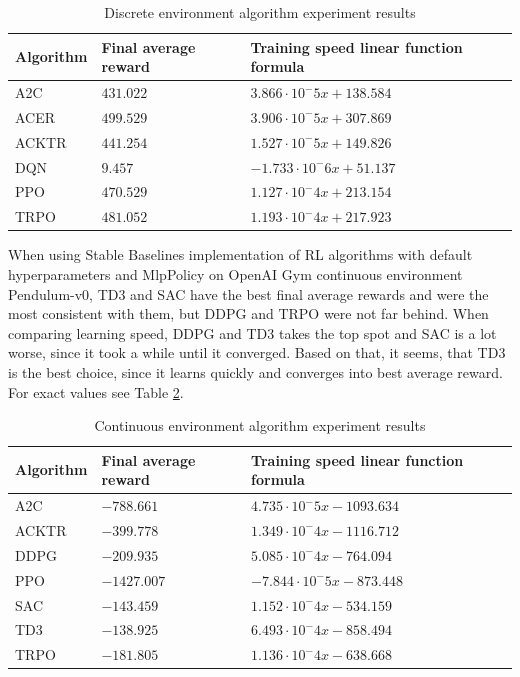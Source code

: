 \documentclass[12pt, a4paper]{article}
\begin{document}
\begin{table}[H]
\centering
\begin{tabular}{|l|l|l|} 
\hline
Algorithm & Final average reward & Training speed linear function formula  \\ 
\hline
A2C       & $431.022$              & $3.866\cdot10^-5x + 138.584$                     \\
ACER      & $499.529$              & $3.906\cdot10^-5x + 307.869$                     \\
ACKTR     & $441.254$              & $1.527\cdot10^-5x + 149.826$                     \\
DQN       & $9.457$                & $-1.733\cdot10^-6x + 51.137$                     \\
PPO       & $470.529$              & $1.127\cdot10^-4x + 213.154$                     \\
TRPO      & $481.052$              & $1.193\cdot10^-4x + 217.923$                     \\
\hline
\end{tabular}
\caption{Discrete environment algorithm experiment results}
\label{DiscreteFinalTable}
\end{table}

When using Stable Baselines implementation of RL algorithms with default hyperparameters and MlpPolicy on OpenAI Gym continuous environment Pendulum-v0, TD3 and SAC have the best final average rewards and were the most consistent with them, but DDPG and TRPO were not far behind. When comparing learning speed, DDPG and TD3 takes the top spot and SAC is a lot worse, since it took a while until it converged. Based on that, it seems, that TD3 is the best choice, since it learns quickly and converges into best average reward. For exact values see Table \ref{ContinuousFinalTable}.

\begin{table}[H]
\centering
\begin{tabular}{|l|l|l|} 
\hline
Algorithm & Final average reward & Training speed linear function formula  \\ 
\hline
A2C       & $-788.661$             & $4.735\cdot10^-5x - 1093.634$                   \\
ACKTR     & $-399.778$             & $1.349\cdot10^-4x - 1116.712$                    \\
DDPG      & $-209.935$             & $5.085\cdot10^-4x - 764.094$                     \\
PPO       & $-1427.007$            & $-7.844\cdot10^-5x - 873.448$                    \\
SAC       & $-143.459$             & $1.152\cdot10^-4x - 534.159$                     \\
TD3       & $-138.925$             & $6.493\cdot10^-4x - 858.494$                     \\
TRPO      & $-181.805$             & $1.136\cdot10^-4x - 638.668$                     \\
\hline
\end{tabular}
\caption{Continuous environment algorithm experiment results}
\label{ContinuousFinalTable}
\end{table}
\end{document}
